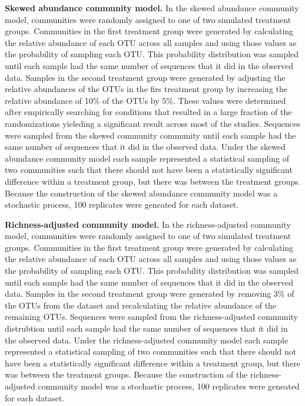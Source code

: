 \documentclass[
]{article}
\begin{document}
\textbf{Skewed abundance community model.} In the skewed abundance
community model, communities were randomly assigned to one of two
simulated treatment groups. Communities in the first treatment group
were generated by calculating the relative abundance of each OTU across
all samples and using those values as the probability of sampling each
OTU. This probability distribution was sampled until each sample had the
same number of sequences that it did in the observed data. Samples in
the second treatment group were generated by adjusting the relative
abundances of the OTUs in the firs treatment group by increasing the
relative abundance of 10\% of the OTUs by 5\%. These values were
determined after empirically searching for conditions that resulted in a
large fraction of the randomizations yieleding a significant result
across most of the studies. Sequences were sampled from the skewed
community community until each sample had the same number of sequences
that it did in the observed data. Under the skewed abundance community
model each sample represented a statistical sampling of two communities
such that there should not have been a statistically significant
difference within a treatment group, but there was between the treatment
groups. Because the construction of the skewed abundance community model
was a stochastic process, 100 replicates were geneated for each dataset.

\textbf{Richness-adjusted community model.} In the richness-adjusted
community model, communities were randomly assigned to one of two
simulated treatment groups. Communities in the first treatment group
were generated by calculating the relative abundance of each OTU across
all samples and using those values as the probability of sampling each
OTU. This probability distribution was sampled until each sample had the
same number of sequences that it did in the observed data. Samples in
the second treatment group were generated by removing 3\% of the OTUs
from the dataset and recalculating the relative abundance of the
remaining OTUs. Sequences were sampled from the richness-adjusted
community distrubtion until each sample had the same number of sequences
that it did in the observed data. Under the richness-adjusted community
model each sample represented a statistical sampling of two communities
such that there should not have been a statistically significant
difference within a treatment group, but there was between the treatment
groups. Because the construction of the richness-adjusted community
model was a stochastic process, 100 replicates were geneated for each
dataset.
\end{document}
